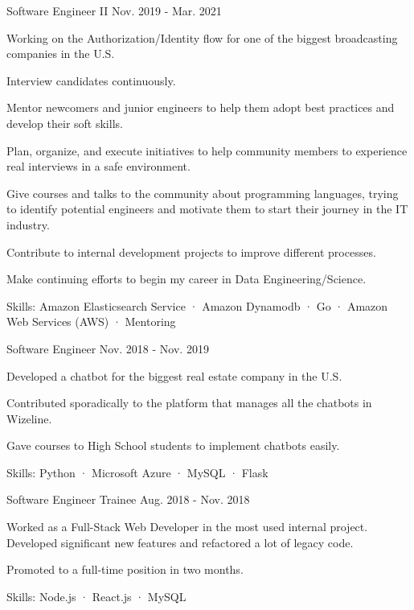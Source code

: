 \begin{cventries}
  \cventry
    {Software Engineer II} %
    {} %
    {} %
    {Nov. 2019 - Mar. 2021} %
    {
      \begin{cvitems} %
        \item {Working on the Authorization/Identity flow for one of the biggest broadcasting companies in the U.S.}
        \item {Interview candidates continuously.}
        \item {Mentor newcomers and junior engineers to help them adopt best practices and develop their soft skills.}
        \item {Plan, organize, and execute initiatives to help community members to experience real interviews in a safe environment.}
        \item {Give courses and talks to the community about programming languages, trying to identify potential engineers and motivate them to start their journey in the IT industry.}
        \item {Contribute to internal development projects to improve different processes.}
        \item {Make continuing efforts to begin my career in Data Engineering/Science.}
        \item {Skills: Amazon Elasticsearch Service · Amazon Dynamodb · Go · Amazon Web Services (AWS) · Mentoring}
      \end{cvitems}
    }
    
  \cventry
    {Software Engineer} %
    {} %
    {} %
    {Nov. 2018 - Nov. 2019} %
    {
      \begin{cvitems} %
        \item {Developed a chatbot for the biggest real estate company in the U.S.}
        \item {Contributed sporadically to the platform that manages all the chatbots in Wizeline.}
        \item {Gave courses to High School students to implement chatbots easily.}
        \item {Skills: Python · Microsoft Azure · MySQL · Flask}
      \end{cvitems}
    }
    
  \cventry
    {Software Engineer Trainee} %
    {} %
    {} %
    {Aug. 2018 - Nov. 2018} %
    {
      \begin{cvitems} %
        \item {Worked as a Full-Stack Web Developer in the most used internal project. Developed significant new features and refactored a lot of legacy code.}
        \item {Promoted to a full-time position in two months.}
        \item {Skills: Node.js · React.js · MySQL}
      \end{cvitems}
    }


\end{cventries}
